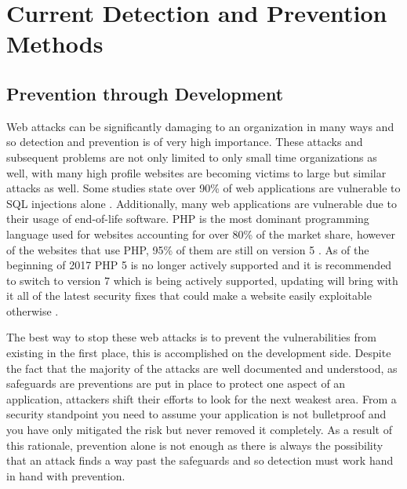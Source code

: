 \chapter{Current Detection and Prevention Methods} \label{sec:sectionThree}

\section{Prevention through Development} \label{sec:preventDevel}

Web attacks can be significantly damaging to an organization in many ways and so detection and prevention is of very high importance.  These attacks and subsequent problems are not only limited to only small time organizations as well, with many high profile websites are becoming victims to large but similar attacks as well.  Some studies state over 90\% of web applications are vulnerable to SQL injections alone \cite{detectionAndPreventionSQL}.  Additionally, many web applications are vulnerable due to their usage of end-of-life software.  PHP is the most dominant programming language used for websites accounting for over 80\% of the market share, however of the websites that use PHP, 95\% of them are still on version 5 \cite{phpStats}.  As of the beginning of 2017 PHP 5 is no longer actively supported and it is recommended to switch to version 7 which is being actively supported, updating will bring with it all of the latest security fixes that could make a website easily exploitable otherwise \cite{phpVersions}\cite{wordpress}.

The best way to stop these web attacks is to prevent the vulnerabilities from existing in the first place, this is accomplished on the development side.  Despite the fact that the majority of the attacks are well documented and understood, as safeguards are preventions are put in place to protect one aspect of an application, attackers shift their efforts to look for the next weakest area.  From a security standpoint you need to assume your application is not bulletproof and you have only mitigated the risk but never removed it completely.  As a result of this rationale, prevention alone is not enough as there is always the possibility that an attack finds a way past the safeguards and so detection must work hand in hand with prevention.

